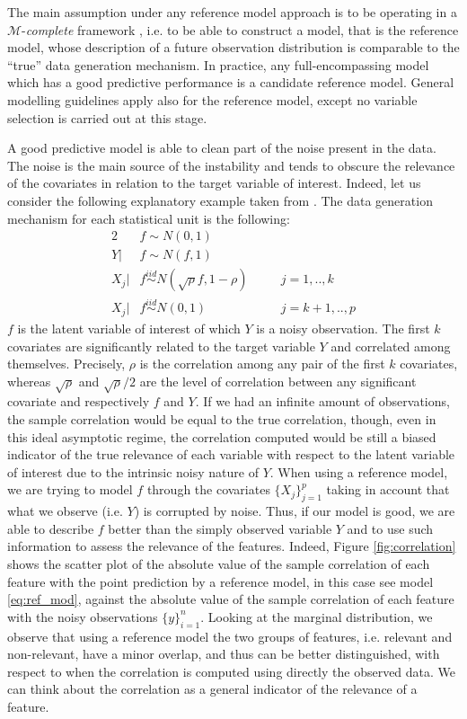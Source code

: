 \documentclass[american,]{article}
\theoremstyle{definition}
\begin{document}
The main assumption under any reference model approach is to be operating in a $\mathcal{M}$-\textit{complete} framework \citep{book:bernardo_smith,vehtari2012survey}, i.e. to be able to construct a model, that is the reference model, whose description of a future observation distribution is comparable to the ``true'' data generation mechanism. In practice, any full-encompassing model which has a good predictive performance is a candidate reference model. General modelling guidelines apply also for the reference model, except no variable selection is carried out at this stage.
 
A good predictive model is able to clean part of the noise present in the data. The noise is the main source of the instability and tends to obscure the relevance of the covariates in relation to the target variable of interest. Indeed, let us consider the following explanatory example taken from \cite{paper:projpred}. The data generation mechanism for each statistical unit is the following:
\
\begin{alignat}{2} \label{eq:simulated_data}
     &f\sim N(0,1) && \nonumber \\ 
     Y|&f\sim N(f,1) && \\
     X_{j}|&f \overset{iid}{\sim} N(\sqrt{\rho}f,1-\rho) \quad &&j=1,..,k \nonumber \\
     X_{j}|&f \overset{iid}{\sim} N(0,1) &&j=k+1,..,p \nonumber
\end{alignat}
$f$ is the latent variable of interest of which $Y$ is a noisy observation. The first $k$ covariates are significantly related to the target variable $Y$ and correlated among themselves. Precisely, $\rho$ is the correlation among any pair of the first $k$ covariates, whereas $\sqrt{\rho}$ and $\sqrt{\rho}/2$ are the level of correlation between any significant covariate and respectively $f$ and $Y$. If we had an infinite amount of observations, the sample correlation would be equal to the true correlation, though, even in this ideal asymptotic regime, the correlation computed would be still a biased indicator of the true relevance of each variable with respect to the latent variable of interest due to the intrinsic noisy nature of $Y$. When using a reference model, we are trying to model $f$ through the covariates $\{X_{j}\}_{j=1}^{p}$ taking in account that what we observe (i.e. $Y$) is corrupted by noise. Thus, if our model is good, we are able to describe $f$ better than the simply observed variable $Y$ and to use such information to assess the relevance of the features. Indeed, Figure \ref{fig:correlation} shows the scatter plot of the absolute value of the sample correlation of each feature with the point prediction by a reference model, in this case see model \eqref{eq:ref_mod}, against the absolute value of the sample correlation of each feature with the noisy observations $\{y\}_{i=1}^{n}$. Looking at the marginal distribution, we observe that using a reference model the two groups of features, i.e. relevant and non-relevant, have a minor overlap, and thus can be better distinguished, with respect to when the correlation is computed using directly the observed data. We can think about the correlation as a general indicator of the relevance of a feature.  
\end{document}
